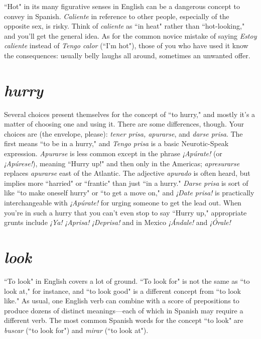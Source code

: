 ``Hot" in its many figurative senses in English can be a dangerous concept to convey in Spanish. \emph{Caliente} in reference to other
people, especially of the opposite sex, is risky. Think of \emph{caliente} as
``in heat" rather than ``hot-looking," and you'll get the general idea. As
for the common novice mistake of saying \emph{Estoy caliente} instead of
\emph{Tengo calor} (``I'm hot"), those of you who have used it know the consequences: usually belly laughs all around, sometimes an unwanted offer.

\section{\emph{hurry}}

Several choices present themselves for the concept of ``to
hurry," and mostly it's a matter of choosing one and using it. There are
some differences, though. Your choices are (the envelope, please): \emph{tener
prisa, apurarse}, and \emph{darse prisa}. The first means ``to be in a hurry,"
and \emph{Tengo prisa} is a basic Neurotic-Speak expression. \emph{Apurarse} is less
common except in the phrase \emph{¡Apúrate!} (or \emph{¡Apúrese!}), meaning ``Hurry
up!" and then only in the Americas; \emph{apresurarse} replaces \emph{apurarse} east
of the Atlantic. The adjective \emph{apurado} is often heard, but implies more
``harried" or ``frantic" than just ``in a hurry." \emph{Darse prisa} is sort of like
``to make oneself hurry" or ``to get a move on," and \emph{¡Date prisa!} is
practically interchangeable with \emph{¡Apúrate!} for urging someone to get
the lead out. When you're in such a hurry that you can't even stop to
say ``Hurry up," appropriate grunts include \emph{¡Ya! ¡Aprisa! ¡Deprisa!} and
in Mexico \emph{¡Ándale!} and \emph{¡Órale!}

\section{\emph{look}}

``To look" in English covers a lot of ground. ``To look for" is
not the same as ``to look at," for instance, and ``to look good" is a different concept from ``to look like." As usual, one English verb can
combine with a score of prepositions to produce dozens of distinct
meanings---each of which in Spanish may require a different verb. The
most common Spanish words for the concept ``to look" are \emph{buscar} (``to
look for") and \emph{mirar} (``to look at").

